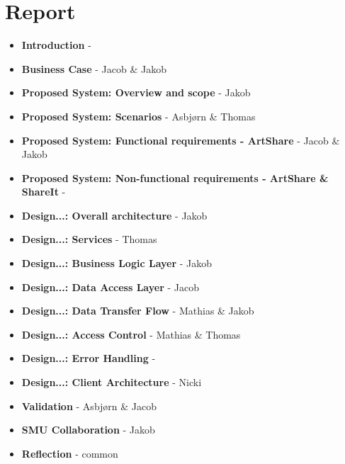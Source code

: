 \section{Report}
\begin{itemize}
\item \textbf{Introduction} - 
\item \textbf{Business Case} - Jacob \& Jakob
\item \textbf{Proposed System: Overview and scope} - Jakob
\item \textbf{Proposed System: Scenarios} - Asbjørn \& Thomas
\item \textbf{Proposed System: Functional requirements - ArtShare} - Jacob \& Jakob
\item \textbf{Proposed System: Non-functional requirements - ArtShare \& ShareIt} - 
\item \textbf{Design...: Overall architecture} - Jakob
\item \textbf{Design...: Services} - Thomas
\item \textbf{Design...: Business Logic Layer} - Jakob
\item \textbf{Design...: Data Access Layer} - Jacob
\item \textbf{Design...: Data Transfer Flow} - Mathias \& Jakob
\item \textbf{Design...: Access Control} - Mathias \& Thomas
\item \textbf{Design...: Error Handling} - 
\item \textbf{Design...: Client Architecture} - Nicki
\item \textbf{Validation} - Asbjørn \& Jacob
\item \textbf{SMU Collaboration} - Jakob
\item \textbf{Reflection} - common 
\end{itemize}